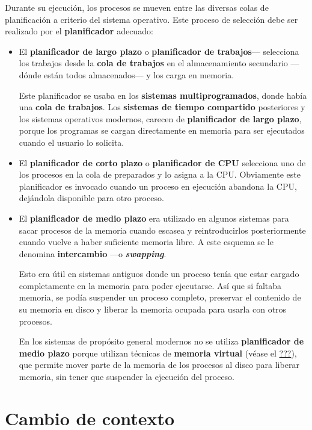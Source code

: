 Durante su ejecución, los procesos se mueven entre las diversas colas de
planificación a criterio del sistema operativo. Este proceso de
selección debe ser realizado por el \textbf{planificador} adecuado:

\begin{itemize}
\item
  El \textbf{planificador de largo plazo}{} o \textbf{planificador de
  trabajos}{}--- selecciona los trabajos desde la \textbf{cola de
  trabajos} en el almacenamiento secundario ---dónde están todos
  almacenados--- y los carga en memoria.

  Este planificador se usaba en los \textbf{sistemas multiprogramados},
  donde había una \textbf{cola de trabajos}. Los \textbf{sistemas de
  tiempo compartido} posteriores y los sistemas operativos modernos,
  carecen de \textbf{planificador de largo plazo}, porque los programas
  se cargan directamente en memoria para ser ejecutados cuando el
  usuario lo solicita.
\item
  El \textbf{planificador de corto plazo}{} o \textbf{planificador de
  CPU}{} selecciona uno de los procesos en la cola de preparados y lo
  asigna a la CPU. Obviamente este planificador es invocado cuando un
  proceso en ejecución abandona la CPU, dejándola disponible para otro
  proceso.
\item
  El \textbf{planificador de medio plazo} {} era utilizado en algunos
  sistemas para sacar procesos de la memoria cuando escasea y
  reintroducirlos posteriormente cuando vuelve a haber suficiente
  memoria libre. A este esquema se le denomina \textbf{{}intercambio}
  ---o \textbf{\emph{{}swapping}}.

  Esto era útil en sistemas antiguos donde un proceso tenía que estar
  cargado completamente en la memoria para poder ejecutarse. Así que si
  faltaba memoria, se podía suspender un proceso completo, preservar el
  contenido de su memoria en disco y liberar la memoria ocupada para
  usarla con otros procesos.

  En los sistemas de propósito general modernos no se utiliza
  \textbf{planificador de medio plazo} porque utilizan técnicas de
  \textbf{memoria virtual} (véase el \hyperref[memoria_virtual]{???}),
  que permite mover parte de la memoria de los procesos al disco para
  liberar memoria, sin tener que suspender la ejecución del proceso.
\end{itemize}

\section{Cambio de contexto}\label{_cambio_de_contexto}

